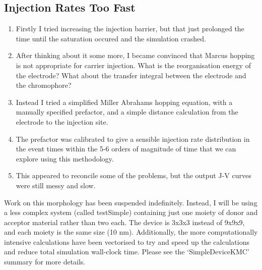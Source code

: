 \documentclass[12pt]{article}
\begin{document}
\subsection{Injection Rates Too Fast}

\begin{enumerate}
    \item{Firstly I tried increasing the injection barrier, but that just prolonged the time until the saturation occured and the simulation crashed.}
    \item{After thinking about it some more, I became convinced that Marcus hopping is not appropriate for carrier injection.
        What is the reorganisation energy of the electrode? 
    What about the transfer integral between the electrode and the chromophore?}
    \item{Instead I tried a simplified Miller Abrahams hopping equation, with a manually specified prefactor, and a simple distance calculation from the electrode to the injection site.}
    \item{The prefactor was calibrated to give a sensible injection rate distribution in the event times within the 5-6 orders of magnitude of time that we can explore using this methodology.}
    \item{This appeared to reconcile some of the problems, but the output J-V curves were still messy and slow.}
\end{enumerate}

Work on this morphology has been suspended indefinitely.
Instead, I will be using a less complex system (called testSimple) containing just one moiety of donor and acceptor material rather than two each.
The device is 3x3x3 instead of 9x9x9, and each moiety is the same size (10 nm).
Additionally, the more computationally intensive calculations have been vectorised to try and speed up the calculations and reduce total simulation wall-clock time.
Please see the `SimpleDeviceKMC' summary for more details.



\end{document}
